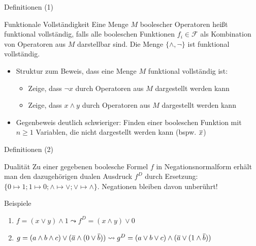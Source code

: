 \begin{frame}[c, fragile]{Definitionen (1)}{}
	\begin{block}{Funktionale Vollständigkeit}
		Eine Menge $M$ boolescher Operatoren heißt funktional vollständig, falls alle booleschen Funktionen $f_i\in\mathcal{F}$ als Kombination von Operatoren aus $M$ darstellbar sind. Die Menge $\{\wedge, \neg\}$ ist funktional vollständig.
	\end{block}
	\vfill{}
	\begin{itemize}
		\item Struktur zum Beweis, dass eine Menge $M$ funktional vollständig ist:
		      \begin{itemize}
			      \item Zeige, dass $\neg x$ durch Operatoren aus $M$ dargestellt werden kann
			      \item Zeige, dass $x\wedge y$ durch Operatoren aus $M$ dargestellt werden kann
		      \end{itemize}
		\item Gegenbeweis deutlich schwieriger: Finden einer booleschen Funktion  mit $n\ge1$ Variablen, die nicht dargestellt werden kann (bspw. $\mkern1mu\overline{\mkern-1mux}$)
	\end{itemize}
\end{frame}

\begin{frame}[c, fragile]{Definitionen  (2)}{}
	\begin{block}{Dualität}
		Zu einer gegebenen boolesche Formel $f$ in Negationsnormalform erhält man den dazugehörigen dualen Ausdruck $f^D$ durch Ersetzung: $\{0\mapsto 1; 1\mapsto 0; \wedge\mapsto\vee; \vee\mapsto\wedge\}$. Negationen bleiben davon unberührt!
	\end{block}
	\vfill{}
	\begin{block}{Beispiele}
		\begin{enumerate}
			\item $f=(x \vee y) \wedge 1\leadsto f^D=(x\wedge y)\vee 0$
			\item $g=(a \wedge b\wedge c) \vee (\mkern1mu\overline{\mkern-1mua} \wedge (0\vee \mkern1mu\overline{\mkern-1mub}))\leadsto g^D=(a \vee b\vee c) \wedge (\mkern1mu\overline{\mkern-1mua} \vee (1\wedge \mkern1mu\overline{\mkern-1mub}))$
		\end{enumerate}
	\end{block}
\end{frame}

